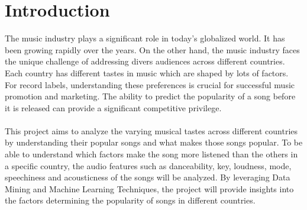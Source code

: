 \chapter{Introduction}

The music industry plays a significant role in today’s globalized world.
It has been growing rapidly over the years. On the other hand, the music
industry faces the unique challenge of addressing divers audiences across
different countries. Each country has different tastes in music which are shaped
by lots of factors. For record labels, understanding these preferences is
crucial for successful music promotion and marketing. The ability to predict
the popularity of a song before it is released can provide a significant 
competitive privilege.\\
\\
This project aims to analyze the varying musical tastes across different countries by 
understanding their popular songs and what makes those songs popular. To be able to understand
which factors make the song more listened than the others in a specific country, the audio features 
such as danceability, key, loudness, mode, speechiness and acousticness of the songs will be analyzed.
By leveraging Data Mining and Machine Learning Techniques, the project will provide insights into
the factors determining the popularity of songs in different countries.\\


